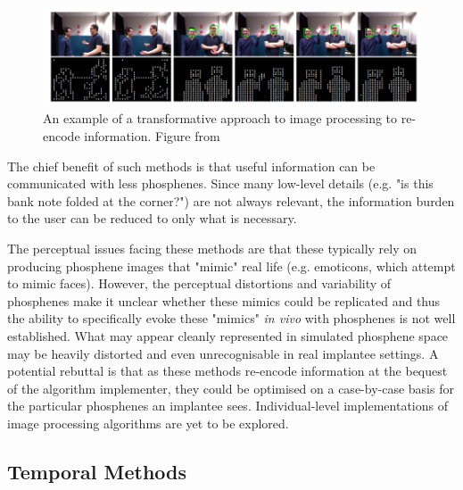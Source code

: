 \documentclass[a4paper,11pt,openany]{book}
\begin{document}
\begin{figure}[htbp]
\centering
\includegraphics[width=.9\linewidth]{./graphics/litreview/transformative.png}
\caption[Example of using a transformative approach to image processing to re-encode information]{\label{fig:org0f25da0}
An example of a transformative approach to image processing to re-encode information. Figure from \cite{lui_transformative_2012}}
\end{figure}

The chief benefit of such methods is that useful information can be communicated with less phosphenes.
Since many low-level details (e.g. "is this bank note folded at the corner?") are not always relevant, the information burden to the user can be reduced to only what is necessary.

The perceptual issues facing these methods are that these typically rely on producing phosphene images that "mimic" real life (e.g. emoticons, which attempt to mimic faces). \cite{lui_transformative_2012}
However, the perceptual distortions and variability of phosphenes make it unclear whether these mimics could be replicated and thus the ability to specifically evoke these "mimics" \emph{in vivo} with phosphenes is not well established.
What may appear cleanly represented in simulated phosphene space may be heavily distorted and even unrecognisable in real implantee settings.
A potential rebuttal is that as these methods re-encode information at the bequest of the algorithm implementer, they could be optimised on a case-by-case basis for the particular phosphenes an implantee sees.
Individual-level implementations of image processing algorithms are yet to be explored.

\subsection*{Temporal Methods}
\label{sec:org0c75b7b}
\end{document}
